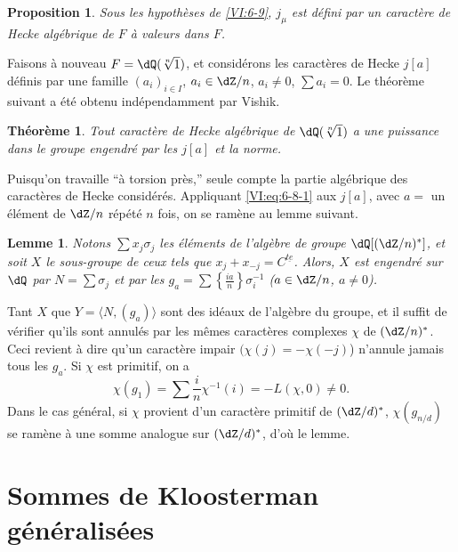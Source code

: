 \documentclass[oneside]{book}
\theoremstyle{sga-source}
\theoremstyle{sga-source-dash}
\theoremstyle{sga-source-dotdash}
\theoremstyle{sga-source-number-note-dash}
\theoremstyle{sga-source-note-number-dotdash}
\theoremstyle{sga-source-example-dotdash}
\theoremstyle{sga-source-inline-number}
\theoremstyle{sga-source-bare-number}
\theoremstyle{sga-source}
\newtheorem{lemma_}[subsection]{Lemme}
\newtheorem{theorem_}[subsection]{Théorème}
\newtheorem{proposition_}[subsection]{Proposition}
\newcommand{\PrintPage}[1]{}\newcommand{\MathPage}[1]{}\newcommand{\PrintCite}[2]{#1}\newcommand{\var}[3]{#1}
\begin{document}
\begin{proposition_}\label{VI:6-10}
Sous les hypothèses de \ref{VI:6-9}, $j_\mu$ est défini par un caractère 
de Hecke algébrique de $F$ à valeurs dans $F$. 
\end{proposition_}

Faisons à nouveau $F=\dQ(\sqrt[n]{1})$, et considérons les caractères de 
Hecke $j[a]$ définis par une famille $(a_i)_{i\in I}$, $a_i\in \dZ/n$, 
$a_i\ne 0$, $\sum a_i=0$. Le théorème suivant a été obtenu 
indépendamment par Vishik. 





\begin{theorem_}\label{VI:6-11}
Tout caractère de Hecke algébrique de $\dQ(\sqrt[n]{1})$ a une puissance 
dans le groupe engendré par les $j[a]$ et la norme. 
\end{theorem_}

Puisqu'on travaille ``à torsion près,'' seule compte la partie algébrique 
des caractères de Hecke considérés. Appliquant \eqref{VI:eq:6-8-1} aux 
$j[a]$, avec $a=$ un élément de $\dZ/n$ répété $n$ fois, on se 
ramène au lemme suivant.





\begin{lemma_}\label{VI:6-12}
Notons $\sum x_j \sigma_j$ les éléments de l'algèbre de groupe 
$\dQ[(\dZ/n)^\ast]$, et soit $X$ le sous-groupe de ceux tels que 
$x_j+x_{-j}=C^{\underline{t e}}$. Alors, $X$ est engendré sur $\dQ$ par 
$N=\sum \sigma_j$ et par les 
$g_a=\sum \left\{ \frac{i a}{n}\right\} \sigma_i^{-1}$ 
($a\in \dZ/n$, $a\ne 0$). 
\end{lemma_}

\PrintPage{218}
Tant $X$ que $Y=\langle N,(g_a)\rangle$ sont des idéaux de l'algèbre du 
groupe, et il suffit de vérifier qu'ils sont annulés par les mêmes 
caractères complexes $\chi$ de $(\dZ/n)^\ast$. Ceci revient à dire qu'un 
caractère impair $(\chi(j)=-\chi(-j)$) n'annule jamais tous les $g_a$. Si 
$\chi$ est primitif, on a 
\[
  \chi(g_1) = \sum \frac i n \chi^{-1}(i) = -L(\chi,0)\ne 0 \text{.} 
\]
Dans le cas général, si $\chi$ provient d'un caractère primitif de 
$(\dZ/d)^\ast$, $\chi(g_{n/d})$ se ramène à une somme analogue sur 
$(\dZ/d)^\ast$, d'où le lemme. 










\PrintPage{219}
\section{Sommes de Kloosterman généralisées}\label{VI:7}
\end{document}
